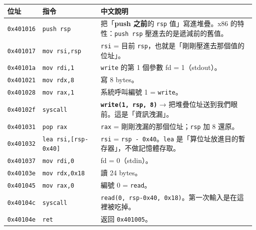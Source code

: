 \documentclass[10pt,a4paper]{article}
\newcounter{none}
\begin{document}
{\def\LTcaptype{none} %
\begin{longtable}[]{@{}
  >{\raggedright\arraybackslash}p{}
  >{\raggedright\arraybackslash}p{}
  >{\raggedright\arraybackslash}p{}@{}}
\toprule\noalign{}
\begin{minipage}[b]{\linewidth}\raggedright
位址
\end{minipage} & \begin{minipage}[b]{\linewidth}\raggedright
指令
\end{minipage} & \begin{minipage}[b]{\linewidth}\raggedright
中文說明
\end{minipage} \\
\midrule\noalign{}
\endhead
\bottomrule\noalign{}
\endlastfoot
\texttt{0x401016} & \texttt{push\ \allowbreak{}rsp} & 把「\textbf{push 之前}的
\texttt{rsp} 值」寫進堆疊。x86 的特性：\texttt{push\ \allowbreak{}rsp}
壓進去的是遞減前的舊值。 \\
\texttt{0x401017} & \texttt{mov\ \allowbreak{}rsi,\allowbreak{}rsp} & \texttt{rsi} = 目前
\texttt{rsp}，也就是「剛剛壓進去那個值的位址」。 \\
\texttt{0x40101a} & \texttt{mov\ \allowbreak{}rdi,\allowbreak{}1} & \texttt{write} 的第 1 個參數
fd = 1（stdout）。 \\
\texttt{0x401021} & \texttt{mov\ \allowbreak{}rdx,\allowbreak{}8} & 寫 8 bytes。 \\
\texttt{0x401028} & \texttt{mov\ \allowbreak{}rax,\allowbreak{}1} & 系統呼叫編號 1 =
\texttt{write}。 \\
\texttt{0x40102f} & \texttt{syscall} &
\textbf{\texttt{write(1,\allowbreak{}\ \allowbreak{}rsp,\allowbreak{}\ \allowbreak{}8)}} →
把堆疊位址送到我們眼前。這是「資訊洩漏」。 \\
\texttt{0x401031} & \texttt{pop\ \allowbreak{}rax} & \texttt{rax} =
剛剛洩漏的那個位址；\texttt{rsp} 加 8 還原。 \\
\texttt{0x401032} & \texttt{lea\ \allowbreak{}rsi,{[}rsp-\allowbreak{}0x40{]}} & \texttt{rsi} =
\texttt{rsp\ \allowbreak{}-\allowbreak{}\ \allowbreak{}0x40}。\texttt{lea}
是「算位址放進目的暫存器」，不做記憶體存取。 \\
\texttt{0x401037} & \texttt{mov\ \allowbreak{}rdi,\allowbreak{}0} & fd = 0（stdin）。 \\
\texttt{0x40103e} & \texttt{mov\ \allowbreak{}rdx,\allowbreak{}0x18} & 讀 24 bytes。 \\
\texttt{0x401045} & \texttt{mov\ \allowbreak{}rax,\allowbreak{}0} & 編號 0 = \texttt{read}。 \\
\texttt{0x40104c} & \texttt{syscall} &
\texttt{read(0,\allowbreak{}\ \allowbreak{}rsp-\allowbreak{}0x40,\allowbreak{}\ \allowbreak{}0x18)}。第一次輸入是在這裡被吃掉。 \\
\texttt{0x40104e} & \texttt{ret} & 返回 \texttt{0x401005}。 \\
\end{longtable}
}
\end{document}
